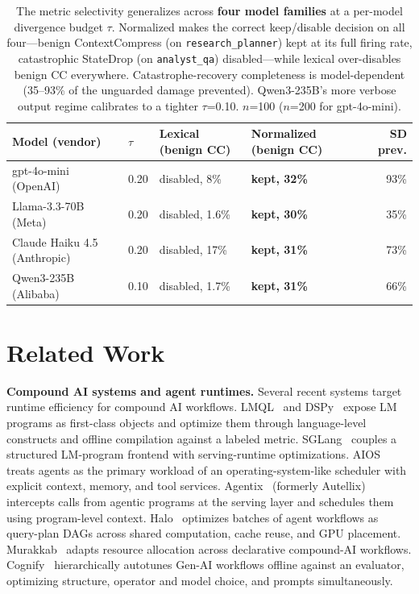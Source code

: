 \documentclass[sigconf,9pt]{acmart}
\begin{document}
\begin{table}[t]
\caption{The metric selectivity generalizes across \textbf{four model families} at a
per-model divergence budget $\tau$. Normalized makes the correct keep/disable decision on all
four---benign ContextCompress (on \texttt{research\_planner}) kept at its full firing rate,
catastrophic StateDrop (on \texttt{analyst\_qa}) disabled---while lexical over-disables benign
CC everywhere. Catastrophe-recovery completeness is model-dependent (35--93\% of the unguarded
damage prevented). Qwen3-235B's more verbose output regime calibrates to a tighter
$\tau$=0.10. $n$=100 ($n$=200 for gpt-4o-mini).}
\label{tab:xmodel}
\small
\begin{tabular}{llllr}
\toprule
Model (vendor) & $\tau$ & Lexical (benign CC) & Normalized (benign CC) & SD prev. \\
\midrule
gpt-4o-mini (OpenAI)       & 0.20 & disabled, 8\%   & \textbf{kept, 32\%} & 93\% \\
Llama-3.3-70B (Meta)       & 0.20 & disabled, 1.6\% & \textbf{kept, 30\%} & 35\% \\
Claude Haiku 4.5 (Anthropic) & 0.20 & disabled, 17\% & \textbf{kept, 31\%} & 73\% \\
Qwen3-235B (Alibaba)       & 0.10 & disabled, 1.7\% & \textbf{kept, 31\%} & 66\% \\
\bottomrule
\end{tabular}
\end{table}

\section{Related Work}
\label{sec:related}

\textbf{Compound AI systems and agent runtimes.} Several recent systems target runtime
efficiency for compound AI workflows. LMQL~\cite{beurer2023lmql} and
DSPy~\cite{khattab2024dspy} expose LM programs as first-class objects and optimize
them through language-level constructs and offline compilation against a labeled
metric. SGLang~\cite{zheng2024sglang} couples a structured LM-program frontend with
serving-runtime optimizations. AIOS~\cite{mei2025aios} treats agents as the primary
workload of an operating-system-like scheduler with explicit context, memory, and tool
services. Agentix~\cite{luo2026agentix} (formerly Autellix) intercepts calls from
agentic programs at the serving layer and schedules them using program-level context.
Halo~\cite{shen2026halo} optimizes batches of agent workflows as query-plan DAGs
across shared computation, cache reuse, and GPU placement.
Murakkab~\cite{chaudhry2025murakkab} adapts resource allocation across declarative
compound-AI workflows. Cognify~\cite{he2025cognify} hierarchically autotunes Gen-AI
workflows offline against an evaluator, optimizing structure, operator and model
choice, and prompts simultaneously.
\end{document}
